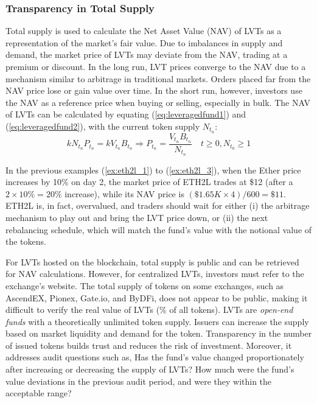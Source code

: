 \subsubsection{Transparency in Total Supply}
Total supply is used to calculate the Net Asset Value (NAV) of LVTs as a representation of the market's fair value. Due to imbalances in supply and demand, the market price of LVTs may deviate from the NAV, trading at a premium or discount. In the long run, LVT prices converge to the NAV due to a mechanism similar to arbitrage in traditional markets. Orders placed far from the NAV price lose or gain value over time. In the short run, however, investors use the NAV as a reference price when buying or selling, especially in bulk. The NAV of LVTs can be calculated by equating (\ref{eq:leveragedfund1}) and (\ref{eq:leveragedfund2}), with the current token supply $N_{t_{n}}$:
\begin{equation}\label{eq:nav}
	kN_{t_{n}}P_{t_{n}}=kV_{t_{n}}B_{t_{n}} \Rightarrow  P_{t_{n}}=\frac{V_{t_{n}}B_{t_{n}}}{N_{t_{n}}}\quad t \ge 0, N_{t_{0}} \ge 1
\end{equation}
\begin{example}
	In the previous examples (\ref{ex:eth2l_1}) to (\ref{ex:eth2l_3}), when the Ether price increases by 10\% on day 2, the market price of ETH2L trades at \$12 (after a $2\times{10\%}=20\%$ increase), while its NAV price is $(\$1.65K\times{4})/600=\$11$. ETH2L is, in fact, overvalued, and traders should wait for either (i) the arbitrage mechanism to play out and bring the LVT price down, or (ii) the next rebalancing schedule, which will match the fund's value with the notional value of the tokens.
\end{example}

For LVTs hosted on the blockchain, total supply is public and can be retrieved for NAV calculations. However, for centralized LVTs, investors must refer to the exchange's website. The total supply of tokens on some exchanges, such as AscendEX, Pionex, Gate.io, and ByDFi, does not appear to be public, making it difficult to verify the real value of LVTs (\% of all tokens). LVTs are \textsl{open-end funds} with a theoretically unlimited token supply. Issuers can increase the supply based on market liquidity and demand for the token. Transparency in the number of issued tokens builds trust and reduces the risk of investment. Moreover, it addresses audit questions such as, Has the fund's value changed proportionately after increasing or decreasing the supply of LVTs? How much were the fund's value deviations in the previous audit period, and were they within the acceptable range?

